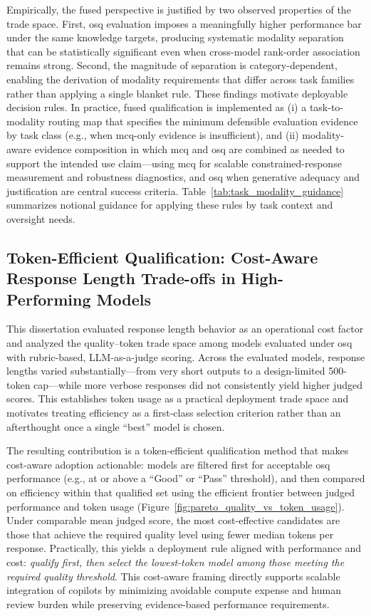 Empirically, the fused perspective is justified by two observed properties of the trade space. First, \ac{osq} evaluation imposes a meaningfully higher performance bar under the same knowledge targets, producing systematic modality separation that can be statistically significant even when cross-model rank-order association remains strong. Second, the magnitude of separation is category-dependent, enabling the derivation of modality requirements that differ across task families rather than applying a single blanket rule. These findings motivate deployable decision rules. In practice, fused qualification is implemented as (i) a task-to-modality routing map that specifies the minimum defensible evaluation evidence by task class (e.g., when \ac{mcq}-only evidence is insufficient), and (ii) modality-aware evidence composition in which \ac{mcq} and \ac{osq} are combined as needed to support the intended use claim—using \ac{mcq} for scalable constrained-response measurement and robustness diagnostics, and \ac{osq} when generative adequacy and justification are central success criteria. Table~\ref{tab:task_modality_guidance} summarizes notional guidance for applying these rules by task context and oversight needs.


\subsection{Token-Efficient Qualification: Cost-Aware Response Length Trade-offs in High-Performing Models}\label{subsec:ch6_contrib4}

This dissertation evaluated response length behavior as an operational cost factor and analyzed the quality--token trade space among models evaluated under \ac{osq} with rubric-based, LLM-as-a-judge scoring. Across the evaluated models, response lengths varied substantially—from very short outputs to a design-limited 500-token cap—while more verbose responses did not consistently yield higher judged scores. This establishes token usage as a practical deployment trade space and motivates treating efficiency as a first-class selection criterion rather than an afterthought once a single ``best'' model is chosen.

The resulting contribution is a token-efficient qualification method that makes cost-aware adoption actionable: models are filtered first for acceptable \ac{osq} performance (e.g., at or above a ``Good'' or ``Pass'' threshold), and then compared on efficiency within that qualified set using the efficient frontier between judged performance and token usage (Figure~\ref{fig:pareto_quality_vs_token_usage}). Under comparable mean judged score, the most cost-effective candidates are those that achieve the required quality level using fewer median tokens per response. Practically, this yields a deployment rule aligned with performance and cost: \emph{qualify first, then select the lowest-token model among those meeting the required quality threshold}. This cost-aware framing directly supports scalable integration of copilots by minimizing avoidable compute expense and human review burden while preserving evidence-based performance requirements.


